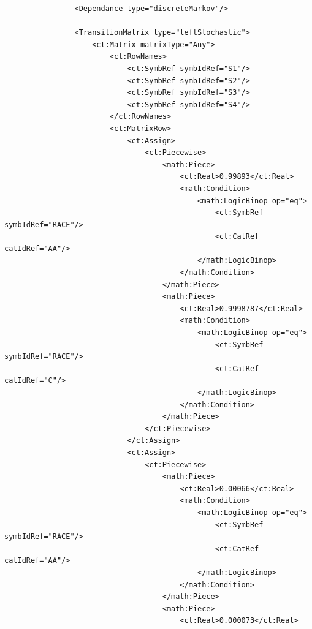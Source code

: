 \begin{itemize}
\begin{lstlisting}
                <Dependance type="discreteMarkov"/>
                
                <TransitionMatrix type="leftStochastic">
                    <ct:Matrix matrixType="Any">
                        <ct:RowNames>
                            <ct:SymbRef symbIdRef="S1"/>
                            <ct:SymbRef symbIdRef="S2"/>
                            <ct:SymbRef symbIdRef="S3"/>
                            <ct:SymbRef symbIdRef="S4"/>
                        </ct:RowNames>
                        <ct:MatrixRow>
                            <ct:Assign>
                                <ct:Piecewise>
                                    <math:Piece>
                                        <ct:Real>0.99893</ct:Real>
                                        <math:Condition>
                                            <math:LogicBinop op="eq">
                                                <ct:SymbRef symbIdRef="RACE"/>
                                                <ct:CatRef catIdRef="AA"/>
                                            </math:LogicBinop>
                                        </math:Condition>
                                    </math:Piece>
                                    <math:Piece>
                                        <ct:Real>0.9998787</ct:Real>
                                        <math:Condition>
                                            <math:LogicBinop op="eq">
                                                <ct:SymbRef symbIdRef="RACE"/>
                                                <ct:CatRef catIdRef="C"/>
                                            </math:LogicBinop>
                                        </math:Condition>
                                    </math:Piece>
                                </ct:Piecewise>
                            </ct:Assign>
                            <ct:Assign>
                                <ct:Piecewise>
                                    <math:Piece>
                                        <ct:Real>0.00066</ct:Real>
                                        <math:Condition>
                                            <math:LogicBinop op="eq">
                                                <ct:SymbRef symbIdRef="RACE"/>
                                                <ct:CatRef catIdRef="AA"/>
                                            </math:LogicBinop>
                                        </math:Condition>
                                    </math:Piece>
                                    <math:Piece>
                                        <ct:Real>0.000073</ct:Real>

\end{lstlisting}
\end{itemize}
